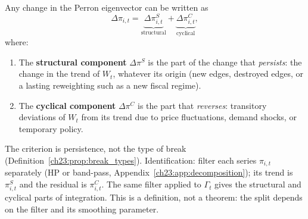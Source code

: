 \documentclass[../structural_economics_book.tex]{subfiles}
\begin{document}
\begin{definition}\label{ch23:def:decomposition}
Any change in the Perron eigenvector can be written as
\begin{equation}\label{ch23:eq:SC_decomp}
\Delta\pi_{i,t} = \underbrace{\Delta\pi_{i,t}^S}_{\text{structural}} + \underbrace{\Delta\pi_{i,t}^C}_{\text{cyclical}},
\end{equation}
where:
\begin{enumerate}
\item The \textbf{structural component} $\Delta\pi^S$ is the part of the change that \emph{persists}: the change in the trend of $W_t$, whatever its origin (new edges, destroyed edges, or a lasting reweighting such as a new fiscal regime).
\item The \textbf{cyclical component} $\Delta\pi^C$ is the part that \emph{reverses}: transitory deviations of $W_t$ from its trend due to price fluctuations, demand shocks, or temporary policy.
\end{enumerate}
The criterion is persistence, not the type of break (Definition~\ref{ch23:prop:break_types}). Identification: filter each series $\pi_{i,t}$ separately (HP or band-pass, Appendix~\ref{ch23:app:decomposition}); its trend is $\pi^S_{i,t}$ and the residual is $\pi^C_{i,t}$. The same filter applied to $\Gamma_t$ gives the structural and cyclical parts of integration. This is a definition, not a theorem: the split depends on the filter and its smoothing parameter.
\end{definition}
\end{document}
